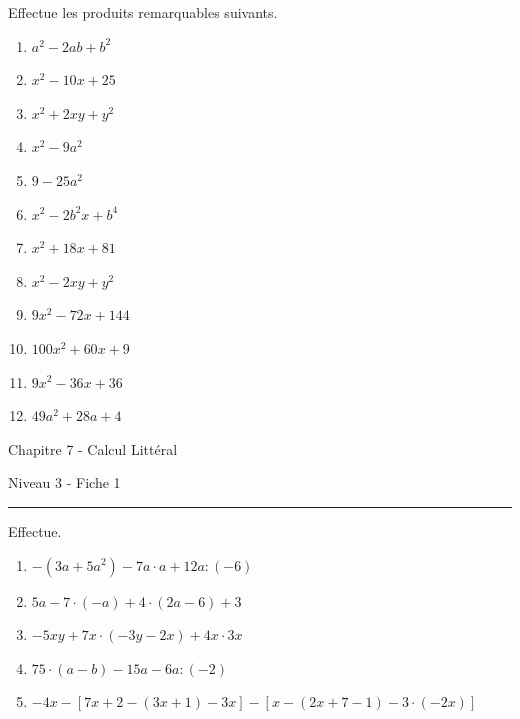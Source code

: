 \documentclass[12pt,parskip=half-, twoside=semi]{scrartcl}
\begin{document}
\begin{exercise}Effectue les produits remarquables suivants.
  \begin{enumerate}[cols=3]
      \item $a^2-2ab+b^2$
      \item $x^2-10x+25$
      \item $x^2+2xy+y^2$
      \item $x^2-9a^2$
      \item $9-25a^2$
      \item $x^2-2b^2x+b^4$
      \item $x^2+18x+81$
      \item $x^2-2xy+y^2$
      \item $9x^2-72x+144$
      \item $100x^2+60x+9$
      \item $9x^2-36x+36$
      \item $49a^2+28a+4$
  \end{enumerate}
\end{exercise}


\begin{center}
  \bfseries
  \begin{Huge}
    Chapitre 7 - Calcul Littéral
  \end{Huge}
  \smallbreak
  \begin{large}
    Niveau 3  - Fiche 1
  \end{large}
  \smallbreak
  \rule[10pt]{.5\linewidth}{1 pt}
\end{center}

\setcounter{exercise}{0}


\begin{exercise}Effectue.
  \begin{enumerate}[cols=2]
    \item $-\left(3 a+5 a^2\right)-7 a \cdot a+12 a:(-6)$
    \item $5 a-7 \cdot(-a)+4 \cdot(2 a-6)+3$
    \item $-5 x y+7 x \cdot(-3 y-2 x)+4 x \cdot 3 x$
    \item $75 \cdot(a-b)-15 a-6 a:(-2)$
    \item $-4 x-[7 x+2-(3 x+1)-3 x]-[x-(2 x+7-1)-3 \cdot(-2 x)]$
  \end{enumerate}
\end{exercise}
\end{document}
